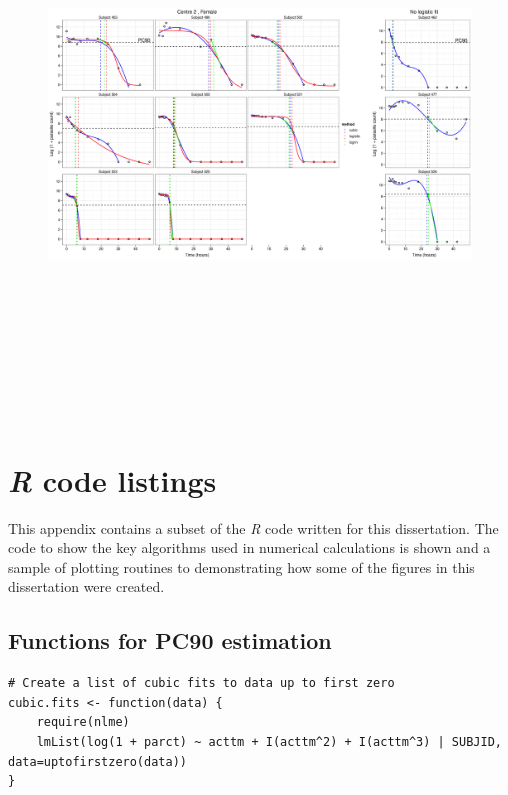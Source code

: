 \begin{singlespace}
\begin{figure}
\end{figure}
\begin{figure}
\centering
\includegraphics[height=150mm]{Afits2F.eps}
\end{figure}

\chapter{\emph{R} code listings}
\lstset{numberstyle=\small,
frame=single,
framesep=6pt,
tabsize=2,
basicstyle=\small\ttfamily,
showstringspaces=false,
columns = fullflexible,
language=R,
breaklines=true,
showstringspaces=false,
lineskip=-1pt}

This appendix contains a subset of the \emph{R} code written for this dissertation. The code to show the key algorithms used in numerical calculations is shown and a sample of plotting routines to demonstrating how some of the figures in this dissertation were created.

\section{Functions for PC90 estimation}\label{R:PC90}
\begin{lstlisting}[caption=Functions to find PC90 by cubic regression,label=R:cubics]
# Create a list of cubic fits to data up to first zero
cubic.fits <- function(data) {
	require(nlme)
	lmList(log(1 + parct) ~ acttm + I(acttm^2) + I(acttm^3) | SUBJID, data=uptofirstzero(data))
}


\end{lstlisting}
\end{singlespace}
